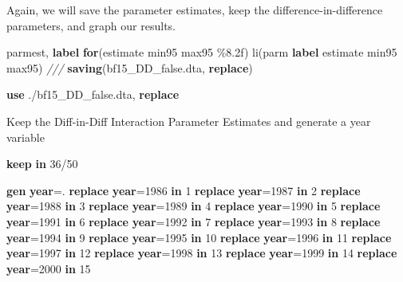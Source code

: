 \documentclass[
]{book}
\newenvironment{Shaded}{\begin{snugshade}}{\end{snugshade}}
\newcommand{\CommentTok}[1]{\textcolor[rgb]{0.56,0.35,0.01}{\textit{#1}}}
\newcommand{\FunctionTok}[1]{\textcolor[rgb]{0.13,0.29,0.53}{\textbf{#1}}}
\newcommand{\KeywordTok}[1]{\textcolor[rgb]{0.13,0.29,0.53}{\textbf{#1}}}
\newcommand{\NormalTok}[1]{#1}
\begin{document}
Again, we will save the parameter estimates, keep the difference-in-difference parameters, and graph our results.

\begin{Shaded}
\begin{Highlighting}[]
\NormalTok{parmest, }\KeywordTok{label} \KeywordTok{for}\NormalTok{(estimate min95 max95 \%8.2f) li(parm }\KeywordTok{label}\NormalTok{ estimate min95 max95) }\CommentTok{///}
 \KeywordTok{saving}\NormalTok{(bf15\_DD\_false.dta, }\KeywordTok{replace}\NormalTok{)}
 
\KeywordTok{use}\NormalTok{ ./bf15\_DD\_false.dta, }\KeywordTok{replace}  
\end{Highlighting}
\end{Shaded}

Keep the Diff-in-Diff Interaction Parameter Estimates and generate a year variable

\begin{Shaded}
\begin{Highlighting}[]
\KeywordTok{keep} \KeywordTok{in}\NormalTok{ 36/50}

\KeywordTok{gen}     \FunctionTok{year}\NormalTok{=.}
\KeywordTok{replace} \FunctionTok{year}\NormalTok{=1986 }\KeywordTok{in}\NormalTok{ 1}
\KeywordTok{replace} \FunctionTok{year}\NormalTok{=1987 }\KeywordTok{in}\NormalTok{ 2}
\KeywordTok{replace} \FunctionTok{year}\NormalTok{=1988 }\KeywordTok{in}\NormalTok{ 3}
\KeywordTok{replace} \FunctionTok{year}\NormalTok{=1989 }\KeywordTok{in}\NormalTok{ 4}
\KeywordTok{replace} \FunctionTok{year}\NormalTok{=1990 }\KeywordTok{in}\NormalTok{ 5}
\KeywordTok{replace} \FunctionTok{year}\NormalTok{=1991 }\KeywordTok{in}\NormalTok{ 6}
\KeywordTok{replace} \FunctionTok{year}\NormalTok{=1992 }\KeywordTok{in}\NormalTok{ 7}
\KeywordTok{replace} \FunctionTok{year}\NormalTok{=1993 }\KeywordTok{in}\NormalTok{ 8}
\KeywordTok{replace} \FunctionTok{year}\NormalTok{=1994 }\KeywordTok{in}\NormalTok{ 9}
\KeywordTok{replace} \FunctionTok{year}\NormalTok{=1995 }\KeywordTok{in}\NormalTok{ 10}
\KeywordTok{replace} \FunctionTok{year}\NormalTok{=1996 }\KeywordTok{in}\NormalTok{ 11}
\KeywordTok{replace} \FunctionTok{year}\NormalTok{=1997 }\KeywordTok{in}\NormalTok{ 12}
\KeywordTok{replace} \FunctionTok{year}\NormalTok{=1998 }\KeywordTok{in}\NormalTok{ 13}
\KeywordTok{replace} \FunctionTok{year}\NormalTok{=1999 }\KeywordTok{in}\NormalTok{ 14}
\KeywordTok{replace} \FunctionTok{year}\NormalTok{=2000 }\KeywordTok{in}\NormalTok{ 15}
\end{Highlighting}
\end{Shaded}
\end{document}
